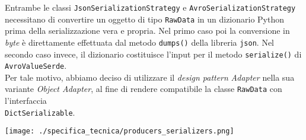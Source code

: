 Entrambe le classi \texttt{JsonSerializationStrategy} e \texttt{AvroSerializationStrategy} necessitano di convertire un oggetto di tipo \texttt{RawData} in un dizionario Python
prima della serializzazione vera e propria. Nel primo caso poi la conversione in \textit{byte} è direttamente effettuata dal metodo \texttt{dumps()} della libreria \texttt{json}. Nel
secondo caso invece, il dizionario costituisce l'input per il metodo \texttt{serialize()} di \texttt{AvroValueSerde}.\\
Per tale motivo, abbiamo deciso di utilizzare il \textit{design pattern} \textit{Adapter} nella sua variante \textit{Object Adapter}, al fine di rendere compatibile la classe \texttt{RawData}
con l'interfaccia \\\texttt{DictSerializable}.

\begin{center}
	\texttt{[image: ./specifica\_tecnica/producers\_serializers.png]}
\end{center}

